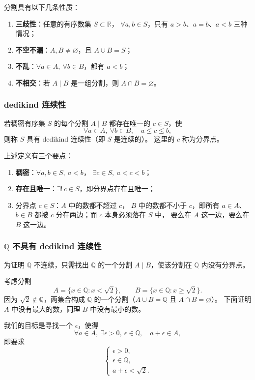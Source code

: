 \documentclass[UTF8,11pt]{ctexart}
\theoremstyle{cnthm}
\begin{document}
分割具有以下几条性质：
\begin{enumerate}
\item \textbf{三歧性}：任意的有序数集 $S\subset\mathbb R$，
$\forall a,b\in S$，只有 $a>b$、$a=b$、$a<b$ 三种情况；
\item \textbf{不空不漏}：$A,B\neq\varnothing$，且 $A\cup B=S$；
\item \textbf{不乱}：$\forall a\in A,\ \forall b\in B$，都有 $a<b$；
\item \textbf{不相交}：若 $A\mid B$ 是一组分割，则 $A\cap B=\varnothing$。
\end{enumerate}

\subsubsection*{dedikind 连续性}

若稠密有序集 $S$ 的每个分割 $A\mid B$
都存在唯一的 $c\in S$，使
\[
\forall a\in A,\ \forall b\in B,\quad a\leq c\leq b,
\]
则称 $S$ 具有 dedikind 连续性（即 $S$ 是连续的）。
这里的 $c$ 称为分界点。

上述定义有三个要点：
\begin{enumerate}
\item \textbf{稠密}：$\forall a,b\in S,\ a<b$，
$\exists c\in S,\ a<c<b$；
\item \textbf{存在且唯一}：$\exists!\,c\in S$，即分界点存在且唯一；
\item 分界点 $c\in S$：$A$ 中的数都不超过 $c$，
$B$ 中的数都不小于 $c$，即所有 $a\in A$、$b\in B$ 都被
$c$ 分在两边；而 $c$ 本身必须落在 $S$ 中，
要么在 $A$ 这一边，要么在 $B$ 这一边。
\end{enumerate}

\subsubsection*{$\mathbb Q$ 不具有 dedikind 连续性}

为证明 $\mathbb Q$ 不连续，只需找出 $\mathbb Q$
的一个分割 $A\mid B$，使该分割在 $\mathbb Q$ 内没有分界点。

考虑分割
\[
A=\{x\in\mathbb Q:x<\sqrt2\},\qquad
B=\{x\in\mathbb Q:x\geq\sqrt2\}.
\]
因为 $\sqrt2\notin\mathbb Q$，两集合构成 $\mathbb Q$
的一个分割（$A\cup B=\mathbb Q$ 且 $A\cap B=\varnothing$）。
下面证明 $A$ 中没有最大的数，同理 $B$ 中没有最小的数。

我们的目标是寻找一个 $\epsilon$，使得
\[
\forall a\in A,\ \exists\epsilon>0,\ \epsilon\in\mathbb Q,\quad
a+\epsilon\in A,
\]
即要求
\[
\begin{cases}
\epsilon>0,\\
\epsilon\in\mathbb Q,\\
a+\epsilon<\sqrt2.
\end{cases}
\]
\end{document}
